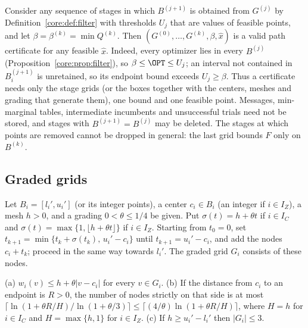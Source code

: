 \begin{remark}\label{core:rem:mincert}
Consider any sequence of stages in which $B^{(j+1)}$ is obtained from $G^{(j)}$
by Definition~\ref{core:def:filter} with thresholds $U_j$ that are values of
feasible points, and let $\beta=\beta^{(k)}=\min Q^{(k)}$. Then
$(G^{(0)},\dots,G^{(k)},\beta,\hat x)$ is a valid path certificate for any
feasible $\hat x$. Indeed, every optimizer lies in every $B^{(j)}$
(Proposition~\ref{core:prop:filter}), so $\beta\le\OPT\le U_j$; an interval
not contained in $B_i^{(j+1)}$ is unretained, so its endpoint bound exceeds
$U_j\ge\beta$. Thus a certificate needs only the stage grids (or the boxes
together with the centers, meshes and grading that generate them), one bound
and one feasible point. Messages, min-marginal tables, intermediate incumbents
and unsuccessful trials need not be stored, and stages with
$B^{(j+1)}=B^{(j)}$ may be deleted. The stages at which points are removed
cannot be dropped in general: the last grid bounds $F$ only on $B^{(k)}$.
\end{remark}

\subsection{Graded grids}\label{core:sec:graded}

\begin{definition}\label{core:def:graded}
Let $B_i=[l_i',u_i']$ (or its integer points), a center $c_i\in B_i$ (an
integer if $i\in I_Z$), a mesh $h>0$, and a grading $0<\theta\le1/4$ be given.
Put $\sigma(t)=h+\theta t$ if $i\in I_C$ and
$\sigma(t)=\max\{1,\lfloor h+\theta t\rfloor\}$ if $i\in I_Z$. Starting from
$t_0=0$, set $t_{k+1}=\min\{t_k+\sigma(t_k),\,u_i'-c_i\}$ until
$t_{k+1}=u_i'-c_i$, and add the nodes $c_i+t_k$; proceed in the same way
towards $l_i'$. The graded grid $G_i$ consists of these nodes.
\end{definition}

\begin{lemma}\label{core:lem:graded}
(a) $w_i(v)\le h+\theta|v-c_i|$ for every $v\in G_i$.
(b) If the distance from $c_i$ to an endpoint is $R>0$, the number of nodes
strictly on that side is at most
$\bigl\lceil\ln(1+\theta R/H)/\ln(1+\theta/3)\bigr\rceil
\le\bigl\lceil(4/\theta)\ln(1+\theta R/H)\bigr\rceil$, where $H=h$ for
$i\in I_C$ and $H=\max\{h,1\}$ for $i\in I_Z$.
(c) If $h\ge u_i'-l_i'$ then $|G_i|\le3$.
\end{lemma}


